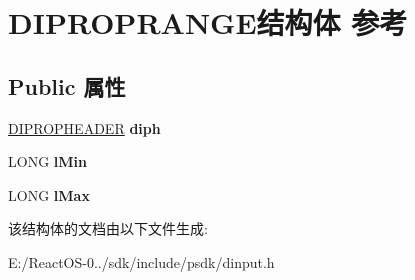 \hypertarget{struct_d_i_p_r_o_p_r_a_n_g_e}{}\section{D\+I\+P\+R\+O\+P\+R\+A\+N\+G\+E结构体 参考}
\label{struct_d_i_p_r_o_p_r_a_n_g_e}
\subsection*{Public 属性}
\begin{DoxyCompactItemize}
\item 
\mbox{\label{struct_d_i_p_r_o_p_r_a_n_g_e_aedbab081d6de04848e13cc3f2daf830d}} 
\hyperlink{struct_d_i_p_r_o_p_h_e_a_d_e_r}{D\+I\+P\+R\+O\+P\+H\+E\+A\+D\+ER} {\bfseries diph}
\item 
\mbox{\label{struct_d_i_p_r_o_p_r_a_n_g_e_a6cd8d017e5379f65cfeae9739cd059b1}} 
L\+O\+NG {\bfseries l\+Min}
\item 
\mbox{\label{struct_d_i_p_r_o_p_r_a_n_g_e_ae4414fca6c6c30ced1612b5d9f417310}} 
L\+O\+NG {\bfseries l\+Max}
\end{DoxyCompactItemize}


该结构体的文档由以下文件生成\+:\begin{DoxyCompactItemize}
\item 
E\+:/\+React\+O\+S-\/0../sdk/include/psdk/dinput.\+h\end{DoxyCompactItemize}
